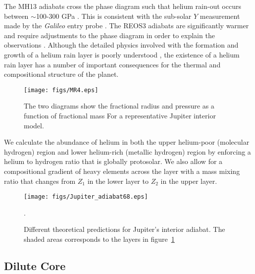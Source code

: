The MH13 adiabats cross the \citet{morales2013} phase diagram such 
that helium rain-out occurs between $\sim$100-300 GPa \citep{militzer2016}.
This is consistent with the sub-solar $Y$ measurement made by the
\textit{Galileo} entry probe \citep{Zahn1998}. The REOS3 adiabats are
significantly warmer and require adjustments to the phase diagram in order to
explain the observations \citep{nettelmann2015}.  Although the detailed physics
involved with the formation and growth of a helium rain layer is poorly
understood \citep{Fortney2010}, the existence of a helium rain layer has a
number of important consequences for the thermal and compositional structure of
the planet.

\begin{figure}[h]
  \begin{center}
      \noindent\texttt{[image: figs/MR4.eps]}
  \end{center}
  \caption{The two diagrams show the
    fractional radius and pressure as a function of fractional mass
    For a representative Jupiter interior model.}
\label{fig:our_Jupiter_model}
\end{figure}



We calculate the abundance of helium in both the upper helium-poor
(molecular hydrogen) region and lower helium-rich (metallic hydrogen) region by
enforcing a helium to hydrogen ratio that is globally protosolar. We also allow
for a compositional gradient of heavy elements across the layer with a mass
mixing ratio that changes from $Z_1$ in the lower layer to $Z_2$ in the upper
layer. 

\begin{figure}[h]
  \begin{center}
    \noindent\texttt{[image: figs/Jupiter\_adiabat68.eps]}
  \end{center}
  \caption{Different theoretical predictions for Jupiter's interior adiabat. The shaded areas corresponds to the layers
    in figure~\ref{fig:our_Jupiter_model}}. 
  \label{fig:jup}
\end{figure}

\subsection{Dilute Core} \label{sec:dilute}

